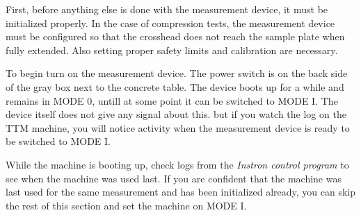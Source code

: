 \documentclass[a4paper]{article}
\begin{document}
First, before anything else is done with the measurement device, it
must be initialized properly. In the case of compression tests, the
measurement device must be configured so that the crosshead does not
reach the sample plate when fully extended. Also setting proper safety
limits and calibration are necessary.


To begin turn on the measurement device. The power switch is on the
back side of the gray box next to the concrete table. The device boots
up for a while and remains in \textsf{MODE 0}, untill at some point it
can be switched to \textsf{MODE I}. The device itself does not give
any signal about this. but if you watch the log on the TTM machine,
you will notice activity when the measurement device is ready to be
switched to \textsf{MODE I}.

While the machine is booting up, check logs from the {\it Instron
control program} to see when the machine was used last. If you are
confident that the machine was last used for the same measurement and
has been initialized already, you can skip the rest of this section
and set the machine on \textsf{MODE I}.
\end{document}
